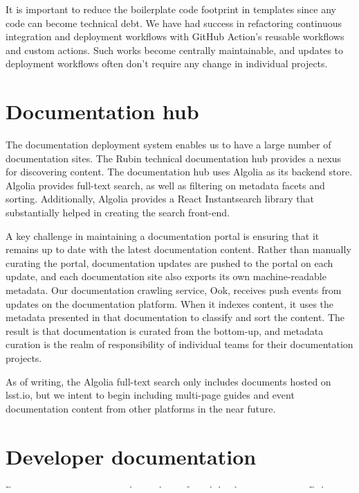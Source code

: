 \documentclass[11pt,twoside]{article}
\begin{document}
It is important to reduce the boilerplate code footprint in templates since any code can become technical debt.
We have had success in refactoring continuous integration and deployment workflows with GitHub Action's reusable workflows and custom actions.
Such works become centrally maintainable, and updates to deployment workflows often don't require any change in individual projects.

\section{Documentation hub}

The documentation deployment system enables us to have a large number of documentation sites.
The Rubin technical documentation hub provides a nexus for discovering content.
The documentation hub uses Algolia as its backend store.
Algolia provides full-text search, as well as filtering on metadata facets and sorting.
Additionally, Algolia provides a React Instantsearch library that substantially helped in creating the search front-end.

A key challenge in maintaining a documentation portal is ensuring that it remains up to date with the latest documentation content.
Rather than manually curating the portal, documentation updates are pushed to the portal on each update, and each documentation site also exports its own machine-readable metadata.
Our documentation crawling service, Ook, receives push events from updates on the documentation platform.
When it indexes content, it uses the metadata presented in that documentation to classify and sort the content.
The result is that documentation is curated from the bottom-up, and metadata curation is the realm of responsibility of individual teams for their documentation projects.

As of writing, the Algolia full-text search only includes documents hosted on lsst.io, but we intent to begin including multi-page guides and event documentation content from other platforms in the near future.

\section{Developer documentation}

Documentation is an essential ingredient of good developer experience.
Rubin Observatory Data Management maintains a developer guide to document and provide standards for all aspects of contributing to the Rubin Observatory codebases.
With respect to writing documentation, the Rubin Developer Guide provides technical guidance on the documentation tools and markup syntaxes.
In the Developer Guide, we also document \emph{how} to write documentation, such as the content style and content patterns (topic types in the topic-based documentation framework).
\end{document}
